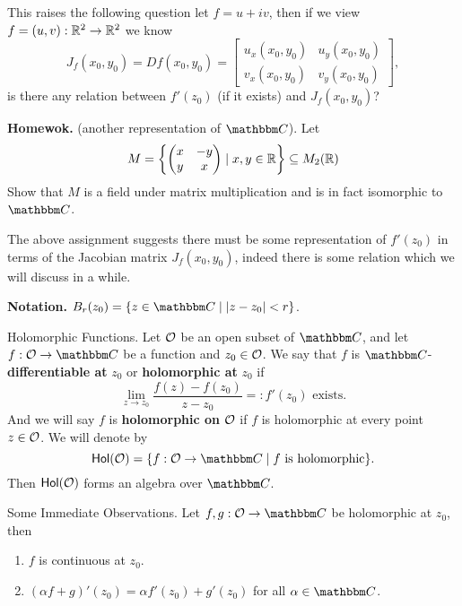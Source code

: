 \documentclass[../ComplexAnalysis_Notes.tex]{subfiles}
\begin{document}
This raises the following question let $f = u + i v$, then if we view $f = (u,v) : \mathbb{R}^2 \to \mathbb{R}^2$ we know
\[
  J_f(x_0,y_0) = Df(x_0,y_0) = \begin{bmatrix}
    u_x(x_0,y_0) & u_y(x_0,y_0) \\ v_x(x_0,y_0) & v_y(x_0,y_0)
  \end{bmatrix},
\]
is there any relation between $f'(z_0)$ (if it exists) and $J_f(x_0,y_0)$?

\textbf{Homewok.} (another representation of $\C$). Let
\begin{equation}\label{eq1:lec1}
  M = \left\{ \begin{pmatrix} x & -y \\ y & x \end{pmatrix} \mid x,y \in \mathbb{R}  \right\} \subseteq M_2(\mathbb{R})
\end{equation}
Show that $M$ is a field under matrix multiplication and is in fact isomorphic to $\C$.

The above assignment suggests there must be some representation of $f'(z_0)$ in terms of the Jacobian matrix $J_f(x_0,y_0)$, indeed there is some relation which we will discuss in a while.

\textbf{Notation.} $B_r(z_0) = \{ z \in \C \mid |z - z_0| < r \}$.

\begin{Def}{Holomorphic Functions.}{}
  Let $\mathcal{O}$ be an open subset of $\C$, and let $f : \mO \to \C$ be a function and $z_0 \in \mathcal{O}$. We say that $f$ is $\C$-\textbf{differentiable at} $z_0$ or \textbf{holomorphic at} $z_0$ if
  \[
    \lim_{z \to z_0} \frac{f(z) - f(z_0)}{z - z_0} =: f'(z_0) \mbox{ exists.}
  \]
  And we will say $f$ is \textbf{holomorphic on} $\mathcal{O}$ if $f$ is holomorphic at every point $z \in \mathcal{O}$. We will denote by
  \[
    \Hol(\mO) = \{ f : \mO \to \C \mid f \mbox{ is holomorphic}\}.
  \]
  Then $\operatorname{\mathsf{Hol}}(\mathcal{O})$ forms an algebra over $\C$.
\end{Def}

\begin{Lem}{Some Immediate Observations.}{}
  Let $f,g : \mO \to \C$ be holomorphic at $z_0$, then
  \begin{enumerate}
    \item $f$ is continuous at $z_0$.
    \item $(\alpha f + g)'(z_0) = \alpha f'(z_0) + g'(z_0)$ for all $\alpha \in \C$.
  \end{enumerate}
\end{Lem}
\end{document}
